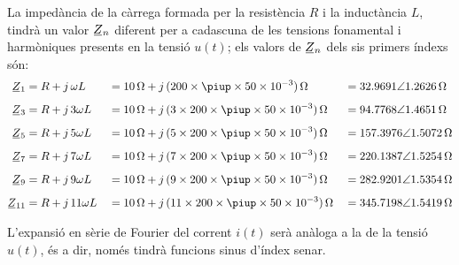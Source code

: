 \begin{exemple}
    La impedància de la càrrega formada per la resistència $R$ i la
    inductància $L$, tindrà un valor $\cmplx{Z}_n$ diferent per a
    cadascuna de les tensions fonamental i harmòniques presents en la
    tensió $u(t)$; els valors de $\cmplx{Z}_n$ dels sis primers índexs són:
    \begin{alignat*}{3}
        \cmplx{Z}_1 &= R + j\, \omega L &&= \qty{10}{\ohm} + j\, (200\times \piup\times 50\times 10^{-3})\unit{\,\ohm} &&=
        \complexqty[complex-angle-unit = radians]{32,9691:1,2626}{\ohm}\\[1ex]
        \cmplx{Z}_3 &= R + j\, 3 \omega L &&= \qty{10}{\ohm} + j\, (3\times 200\times \piup\times 50\times 10^{-3})\unit{\,\ohm} &&=
        \complexqty[complex-angle-unit = radians]{94,7768:1,4651}{\ohm}\\[1ex]
        \cmplx{Z}_5 &= R + j\, 5 \omega L &&= \qty{10}{\ohm} + j\, (5\times 200\times \piup\times 50\times 10^{-3})\unit{\,\ohm} &&=
        \complexqty[complex-angle-unit = radians]{157,3976:1,5072}{\ohm}\\[1ex]
        \cmplx{Z}_7 &= R + j\, 7 \omega L &&= \qty{10}{\ohm} + j\, (7\times 200\times \piup\times 50\times 10^{-3})\unit{\,\ohm} &&=
        \complexqty[complex-angle-unit = radians]{220,1387:1,5254}{\ohm}\\[1ex]
        \cmplx{Z}_9 &= R + j\, 9 \omega L &&= \qty{10}{\ohm} + j\, (9\times 200\times \piup\times 50\times 10^{-3})\unit{\,\ohm} &&=
        \complexqty[complex-angle-unit = radians]{282,9201:1,5354}{\ohm}\\[1ex]
        \cmplx{Z}_{11} &= R + j\, 11 \omega L &&= \qty{10}{\ohm} + j\, (11\times 200\times \piup\times 50\times 10^{-3})\unit{\,\ohm} &&=
        \complexqty[complex-angle-unit = radians]{345,7198:1,5419}{\ohm}
    \end{alignat*}

    L'expansió en sèrie de Fourier del corrent $i(t)$ serà anàloga a la
    de la tensió $u(t)$, és a dir, només tindrà funcions sinus
    d'índex senar.


\end{exemple}
